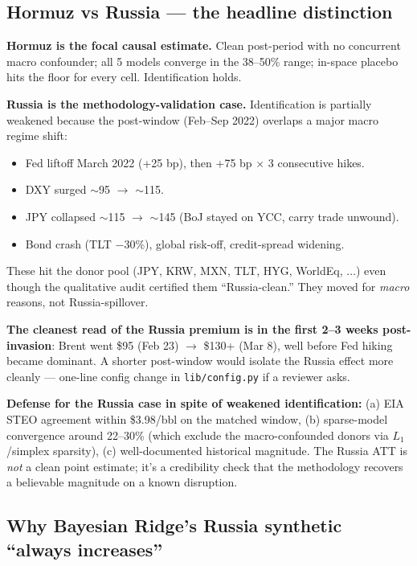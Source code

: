 \documentclass[11pt,a4paper]{article}
\begin{document}
\subsection{Hormuz vs Russia --- the headline distinction}

\textbf{Hormuz is the focal causal estimate.} Clean post-period with no concurrent macro confounder; all 5 models converge in the 38--50\% range; in-space placebo hits the floor for every cell. Identification holds.

\textbf{Russia is the methodology-validation case.} Identification is partially weakened because the post-window (Feb--Sep 2022) overlaps a major macro regime shift:
\begin{itemize}\setlength\itemsep{0.05em}
  \item Fed liftoff March 2022 (+25 bp), then +75 bp $\times$ 3 consecutive hikes.
  \item DXY surged $\sim$95 $\to$ $\sim$115.
  \item JPY collapsed $\sim$115 $\to$ $\sim$145 (BoJ stayed on YCC, carry trade unwound).
  \item Bond crash (TLT $-30\%$), global risk-off, credit-spread widening.
\end{itemize}
These hit the donor pool (JPY, KRW, MXN, TLT, HYG, WorldEq, $\dots$) even though the qualitative audit certified them ``Russia-clean.'' They moved for \emph{macro} reasons, not Russia-spillover.

\textbf{The cleanest read of the Russia premium is in the first 2--3 weeks post-invasion}: Brent went \$95 (Feb 23) $\to$ \$130+ (Mar 8), well before Fed hiking became dominant. A shorter post-window would isolate the Russia effect more cleanly --- one-line config change in \texttt{lib/config.py} if a reviewer asks.

\textbf{Defense for the Russia case in spite of weakened identification:} (a) EIA STEO agreement within \$3.98/bbl on the matched window, (b) sparse-model convergence around 22--30\% (which exclude the macro-confounded donors via $L_1$/simplex sparsity), (c) well-documented historical magnitude. The Russia ATT is \emph{not} a clean point estimate; it's a credibility check that the methodology recovers a believable magnitude on a known disruption.

\subsection{Why Bayesian Ridge's Russia synthetic ``always increases''}
\end{document}
